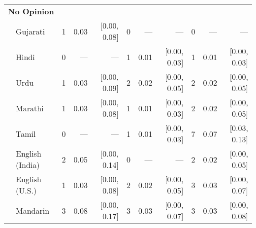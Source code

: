 \begin{table}[t]
\begin{footnotesize}
\begin{tabular}{p{.1in}lrrrrrrrrr}
\midrule
\multicolumn{11}{l}{\textbf{No Opinion}}\\
& Gujarati & 1 & 0.03 & [0.00, 0.08] & 0 & --- & --- & 0 & --- & ---\\

 & Hindi & 0 & --- & --- & 1 & 0.01 & [0.00, 0.03] & 1 & 0.01 & [0.00, 0.03]\\

 & Urdu & 1 & 0.03 & [0.00, 0.09] & 2 & 0.02 & [0.00, 0.05] & 2 & 0.02 & [0.00, 0.05]\\

 & Marathi & 1 & 0.03 & [0.00, 0.08] & 1 & 0.01 & [0.00, 0.03] & 2 & 0.02 & [0.00, 0.05]\\

 & Tamil & 0 & --- & --- & 1 & 0.01 & [0.00, 0.03] & 7 & 0.07 & [0.03, 0.13]\\

 & English (India) & 2 & 0.05 & [0.00, 0.14] & 0 & --- & --- & 2 & 0.02 & [0.00, 0.05]\\

 & English (U.S.) & 1 & 0.03 & [0.00, 0.08] & 2 & 0.02 & [0.00, 0.05] & 3 & 0.03 & [0.00, 0.07]\\

& Mandarin & 3 & 0.08 & [0.00, 0.17] & 3 & 0.03 & [0.00, 0.07] & 3 & 0.03 & [0.00, 0.08]\\
\bottomrule
\end{tabular}
\end{footnotesize}
\end{table}
